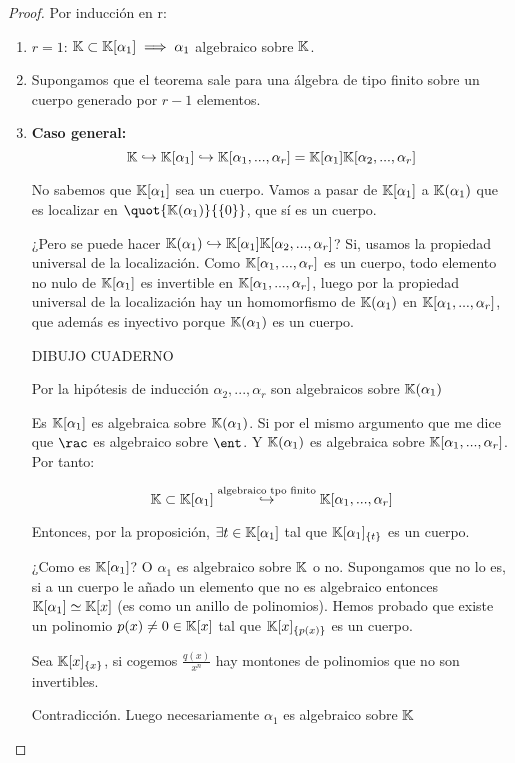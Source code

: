 \begin{proof}
	Por inducción en r:
	\begin{enumerate}
		\item $r=1$: $\mathbb{K} \subset \mathbb{K}[\alpha_1] \implies \alpha_1$ algebraico sobre $\mathbb{K}$.
		\item Supongamos que el teorema sale para una álgebra de tipo finito sobre un cuerpo generado por $r-1$ elementos.
		\item \textbf{Caso general:}
		$$\mathbb{K} \hookrightarrow \mathbb{K}[\alpha_1] \hookrightarrow \mathbb{K}[\alpha_1,...,\alpha_r]=\mathbb{K}[\alpha_1]\mathbb{K}[\alpha_2,...,\alpha_r]$$

		No sabemos que $\mathbb{K}[\alpha_1]$ sea un cuerpo. Vamos a pasar de $\mathbb{K}[\alpha_1]$ a $\mathbb{K}(\alpha_1)$ que es localizar en $\quot{\K(\alpha_1)}{\{0\}}$, que sí es un cuerpo.

		¿Pero se puede hacer $\mathbb{K}(\alpha_1) \hookrightarrow \mathbb{K}[\alpha_1]\mathbb{K}[\alpha_2,...,\alpha_r]$?  Si, usamos la propiedad universal de la localización. Como $\mathbb{K}[\alpha_1,...,\alpha_r]$ es un cuerpo, todo elemento no nulo de $\mathbb{K}[\alpha_1]$ es invertible en $\mathbb{K}[\alpha_1,...,\alpha_r]$, luego por la propiedad universal de la localización hay un homomorfismo de $\mathbb{K}(\alpha_1)$ en $\mathbb{K}[\alpha_1,...,\alpha_r]$, que además es inyectivo porque $\mathbb{K}(\alpha_1)$ es un cuerpo.

		DIBUJO CUADERNO

		Por la hipótesis de inducción $\alpha_2,...,\alpha_r$ son algebraicos sobre $\mathbb{K}(\alpha_1)$

		Es $\mathbb{K}[\alpha_1]$ es algebraica sobre $\mathbb{K}(\alpha_1)$.  Si por el mismo argumento que me dice que $\rac$ es algebraico sobre $\ent$. Y $\mathbb{K}(\alpha_1)$ es algebraica sobre $\mathbb{K}[\alpha_1,...,\alpha_r]$. Por tanto:

		$$ \mathbb{K} \subset \mathbb{K}[\alpha_1] \stackrel{\text{algebraico tpo finito}}{\hookrightarrow} \mathbb{K}[\alpha_1,...,\alpha_r]$$

		Entonces, por la proposición, $\exists t \in \mathbb{K}[\alpha_1]$ tal que $\mathbb{K}[\alpha_1]_{\{t\}}$ es un cuerpo.

		¿Como es $\mathbb{K}[\alpha_1]$? O $\alpha_1$ es algebraico sobre $\mathbb{K}$ o no. Supongamos que no lo es, si a un cuerpo le añado un elemento que no es algebraico entonces $\mathbb{K}[\alpha_1] \simeq \mathbb{K}[x]$ (es como un anillo de polinomios). Hemos probado que existe un polinomio $p(x)\neq 0 \in \mathbb{K}[x]$ tal que $\mathbb{K}[x]_{\{p(x)\}}$ es un cuerpo.

		\begin{example}
			Sea $\mathbb{K}[x]_{\{x\}}$, si cogemos $\frac{q(x)}{x^n}$ hay montones de polinomios que no son invertibles.
		\end{example}

		Contradicción. Luego necesariamente $\alpha_1$ es algebraico sobre $\mathbb{K}$
	\end{enumerate}
\end{proof}

